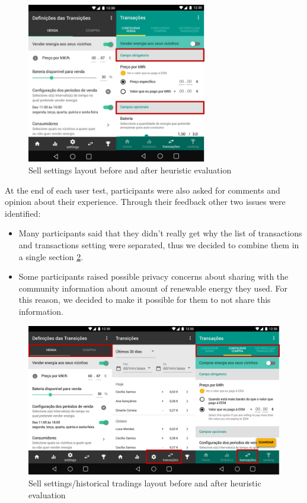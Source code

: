 \begin{figure}[h]
\centering
\includegraphics[width=0.7\textwidth]{./Images/ps1}
\caption{Sell settings layout before and after heuristic evaluation}
\label{fig:ps1}
\end{figure}


At the end of each user test, participants were also asked for comments and opinion about their experience. Through their feedback other two issues were identified:

\begin{itemize}
    \item Many participants said that they didn't really get why the list of transactions and transactions setting were separated, thus we decided to combine them in a single section \cref{fig:ps2}.
    \item Some participants raised possible privacy concerns about sharing with the community information about amount of renewable energy they used. For this reason, we decided to make it possible for them to not share this information.
\end{itemize}


\begin{figure}[h]
\centering
\includegraphics[width=1\textwidth]{./Images/ps2}
\caption{Sell settings/historical tradings layout before and after heuristic evaluation}
\label{fig:ps2}
\end{figure}

